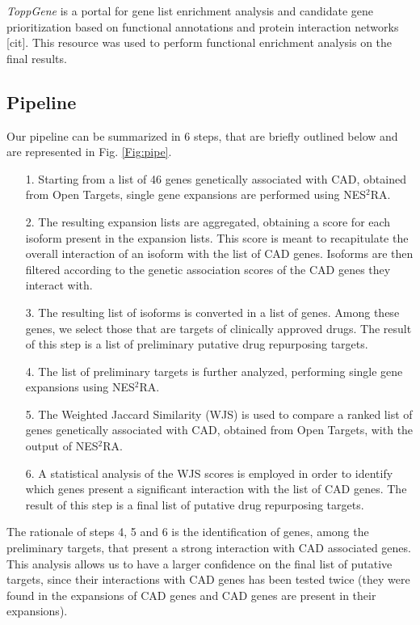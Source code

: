 \documentclass[fleqn,10pt]{SelfArx} %
\begin{document}
\emph{ToppGene} is a portal for gene list enrichment analysis and candidate gene prioritization based on functional annotations and protein interaction networks [cit]. This resource was used to perform functional enrichment analysis on the final results.

\subsection*{Pipeline}

Our pipeline can be summarized in  6 steps, that are briefly outlined below and are represented in Fig. \ref{Fig:pipe}.

\begin{itemize}[leftmargin=*]
	\item[1.] Starting from a list of 46 genes genetically associated with CAD, obtained from Open Targets, single gene expansions are performed using NES$^2$RA.
	\item[2.] The resulting expansion lists are aggregated, obtaining a score for each isoform present in the expansion lists. This score is meant to recapitulate the overall interaction of an isoform with the list of CAD genes. Isoforms are then filtered according to the genetic association scores of the CAD genes they interact with.
	\item[3.] The resulting list of isoforms is converted in a list of genes. Among these genes, we select those that are targets of clinically approved drugs. The result of this step is a list of preliminary putative drug repurposing targets.
	\item[4.] The list of preliminary targets is further analyzed, performing single gene expansions using NES$^2$RA.
	\item[5.] The Weighted Jaccard Similarity (WJS) \cite{WGS} is used to compare a ranked list of genes genetically associated with CAD, obtained from Open Targets, with the output of NES$^2$RA.
	\item[6.] A statistical analysis of the WJS scores is employed in order to identify which genes present a significant interaction with the list of CAD genes. The result of this step is a final list of putative drug repurposing targets.
\end{itemize}

The rationale of steps 4, 5 and 6 is the identification of genes, among the preliminary targets, that present a strong interaction with CAD associated genes. This analysis allows us to have a larger confidence on the final list of putative targets, since their interactions with CAD genes has been tested twice (they were found in the expansions of CAD genes and CAD genes are present in their expansions).
\end{document}
